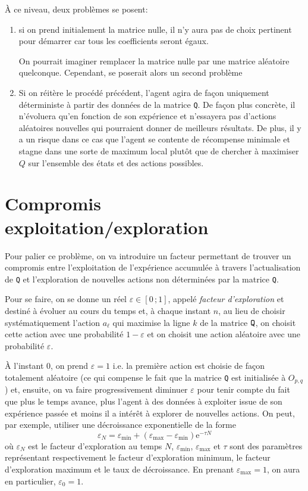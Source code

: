 \`A ce niveau, deux problèmes se posent:
\begin{enumerate}
	\item si on prend initialement la matrice nulle, il n'y aura pas de choix pertinent pour démarrer car tous les coefficients seront égaux.
	
	On pourrait imaginer remplacer la matrice nulle par une matrice aléatoire quelconque. Cependant, se poserait alors un second problème
	\item Si on réitère le procédé précédent, l'agent agira de façon uniquement déterministe à partir des données de la matrice \verb|Q|. De façon plus concrète, il n'évoluera qu'en fonction de son expérience et n'essayera pas d'actions aléatoires nouvelles qui pourraient donner de meilleurs résultats. De plus, il y a un risque dans ce cas que l'agent se contente de récompense \og minimale \fg{} et stagne dans une sorte de maximum local plutôt que de chercher à maximiser $Q$ sur l'ensemble des états et des actions possibles. 
\end{enumerate}

\section{Compromis exploitation/exploration}

Pour palier ce problème, on va introduire un facteur permettant de trouver un compromis entre l'exploitation de l'expérience accumulée à travers l'actualisation de \verb|Q| et l'exploration de nouvelles actions non déterminées par la matrice \verb|Q|.

Pour se faire, on se donne un réel $\varepsilon \in[0\,;1]$, appelé \textit{facteur d'exploration} et destiné à évoluer au cours du temps et, à chaque instant $n$, au lieu de choisir systématiquement l'action $a_{\ell}$ qui maximise la ligne $k$ de la matrice $\verb|Q|$, on choisit cette action avec une probabilité $1-\varepsilon$ et on choisit une action aléatoire avec une probabilité $\varepsilon$.

\`A l'instant $0$, on prend $\varepsilon=1$ i.e. la première action est choisie de façon totalement aléatoire (ce qui compense le fait que la matrice \verb|Q| est initialisée à $O_{p,q}$) et, ensuite, on va faire progressivement diminuer $\varepsilon$ pour tenir compte du fait que plus le temps avance, plus l'agent à des données à exploiter issue de son expérience passée et moins il a intérêt à explorer de nouvelles actions. On peut, par exemple, utiliser une décroissance exponentielle de la forme
$$\varepsilon_N = \varepsilon_{\min}+(\varepsilon_{\max}-\varepsilon_{\min})\mathrm{e}^{-\tau N}$$
où $\varepsilon_N$ est le facteur d'exploration au temps $N$, $\varepsilon_{\min}$, $\varepsilon_{\max}$ et $\tau$ sont des paramètres représentant respectivement le facteur d'exploration minimum, le facteur d'exploration maximum et le taux de décroissance. En prenant $\varepsilon_{\max}=1$, on aura en particulier, $\varepsilon_0=1$.


